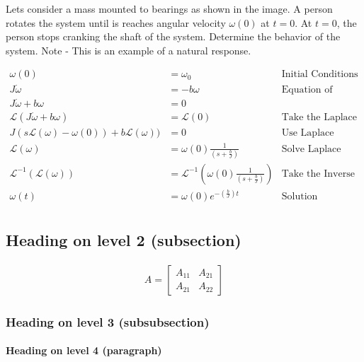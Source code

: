 \documentclass[paper=a4, fontsize=11pt]{scrartcl} %
\numberwithin{equation}{section} %
\numberwithin{figure}{section} %
\numberwithin{table}{section} %
\begin{document}
Lets consider a mass mounted to bearings as shown in the image. A person rotates the system until is reaches angular velocity $\omega(0)$ at $t=0$. At $t=0$, the person stops cranking the shaft of the system. Determine the behavior of the system. Note - This is an example of a natural response. 

\begin{align*}
\omega(0) &= \omega_0  &\text{Initial Conditions}\\
J\dot{\omega} &= -b\omega &\text{Equation of Motion}\\
J\dot{\omega} + b\omega &= 0 &\text{ } \\
\mathcal{L}(J\dot{\omega} + b\omega) &= \mathcal{L}(0)  &\text{Take the Laplace Transform}\\
J(s\mathcal{L}(\omega) - \omega(0)) + b \mathcal{L}(\omega)) &= 0 &\text{Use Laplace Substitution}\\
\mathcal{L}(\omega) &= \omega(0)\frac{1}{(s + \frac{b}{J})}  &\text{Solve Laplace Transform}\\
\mathcal{L}^{-1}(\mathcal{L}(\omega)) &= \mathcal{L}^{-1}\left(\omega(0)\frac{1}{(s + \frac{b}{J})}\right) &\text{Take the Inverse Laplce}\\
\omega(t) &= \omega(0)e^{-\left(\frac{b}{J}\right)t} &\text{Solution}\\
\end{align*}




\subsection{Heading on level 2 (subsection)}


\begin{align}
A = 
\begin{bmatrix}
A_{11} & A_{21} \\
A_{21} & A_{22}
\end{bmatrix}
\end{align}



\subsubsection{Heading on level 3 (subsubsection)}



\paragraph{Heading on level 4 (paragraph)}
\end{document}
